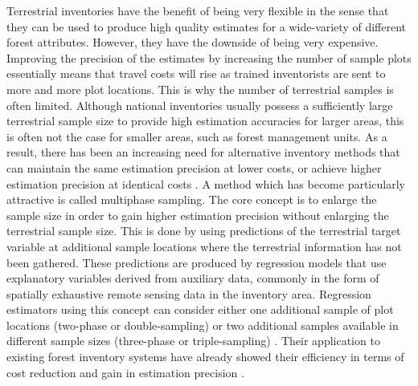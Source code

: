 \documentclass[article]{jss}
\begin{document}
Terrestrial inventories have the benefit of being very flexible in the sense that they can be used to produce high quality estimates for a wide-variety of different forest attributes. However, they have the downside of being very expensive.  Improving the precision of the estimates by increasing the number of sample plots essentially means that travel costs will rise as trained inventorists are sent to more and more plot locations. This is why the number of terrestrial samples is often limited. Although national inventories usually possess a sufficiently large terrestrial sample size to provide high estimation accuracies for larger areas, this is often not the case for smaller areas, such as forest management units.  As a result, there has been an increasing need for alternative inventory methods that can maintain the same estimation precision at lower costs, or achieve higher estimation precision at identical costs \citep{vonluepke2013}. A method which has become particularly attractive is called multiphase sampling. The core concept is to enlarge the sample size in order to gain higher estimation precision without enlarging the terrestrial sample size. This is done by using predictions of the terrestrial target variable at additional sample locations where the terrestrial information has not been gathered. These predictions are produced by regression models that use explanatory variables derived from auxiliary
data, commonly in the form of spatially exhaustive remote sensing data in the inventory area. Regression estimators using this concept can consider either one additional sample of plot locations (two-phase or double-sampling) or two additional samples available in different sample sizes (three-phase or triple-sampling) \citep{gregoire2007, saborowski2010, mandallaz2013a, mandallaz2013c, vonLuebke2012}. Their application to existing forest inventory systems have already showed their efficiency in terms of cost reduction and gain in estimation precision \citep{breidenbach2012, vonLuebke2014, mandallaz2013b, magnussen2014, massey2014a}.\par
\end{document}
